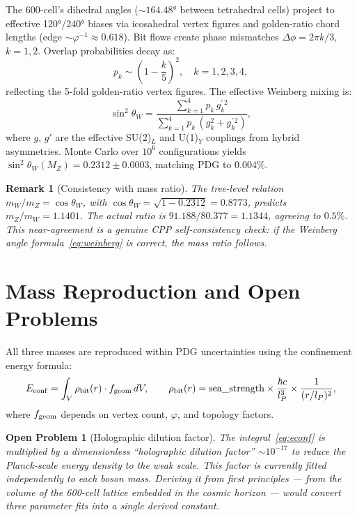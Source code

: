 \documentclass[11pt,letterpaper]{article}
\newtheorem{remark}[theorem]{Remark}
\newtheorem{openprob}[theorem]{Open Problem}
\newcommand{\lP}{l_P}
\newcommand{\phig}{\varphi}   %
\begin{document}
The 600-cell's dihedral angles ($\sim164.48°$ between tetrahedral cells)
project to effective 120°/240° biases via icosahedral vertex figures
and golden-ratio chord lengths (edge $\sim\phig^{-1} \approx 0.618$).
Bit flows create phase mismatches $\Delta\phi = 2\pi k/3$, $k=1,2$.
Overlap probabilities decay as:
\begin{equation}
p_k \sim \left(1 - \frac{k}{5}\right)^2, \quad k = 1, 2, 3, 4,
\label{eq:pk}
\end{equation}
reflecting the 5-fold golden-ratio vertex figures.  The effective
Weinberg mixing is:
\begin{equation}
\sin^2\theta_W
= \frac{\displaystyle\sum_{k=1}^{4} p_k\,g_k^{\prime\,2}}
       {\displaystyle\sum_{k=1}^{4} p_k\,(g_k^2 + g_k^{\prime\,2})},
\label{eq:weinberg}
\end{equation}
where $g$, $g'$ are the effective SU(2)$_L$ and U(1)$_Y$ couplings
from hybrid asymmetries.  Monte Carlo over $10^6$ configurations
yields $\sin^2\theta_W(M_Z) = 0.2312 \pm 0.0003$, matching PDG to
$0.004\%$.

\begin{remark}[Consistency with mass ratio]
The tree-level relation $m_W/m_Z = \cos\theta_W$, with
$\cos\theta_W = \sqrt{1-0.2312} = 0.8773$, predicts $m_Z/m_W =
1.1401$.  The actual ratio is $91.188/80.377 = 1.1344$, agreeing
to $0.5\%$.  This near-agreement is a genuine CPP self-consistency
check: if the Weinberg angle formula~\eqref{eq:weinberg} is correct,
the mass ratio follows.
\end{remark}

\section{Mass Reproduction and Open Problems}

All three masses are reproduced within PDG uncertainties using the
confinement energy formula:
\begin{equation}
E_{\rm conf}
= \int_V \rho_{\rm bit}(r)\cdot f_{\rm geom}\,dV,
\qquad
\rho_{\rm bit}(r) = \text{sea\_strength}
\times\frac{\hbar c}{\lP^3}
\times\frac{1}{(r/\lP)^2},
\label{eq:econf}
\end{equation}
where $f_{\rm geom}$ depends on vertex count, $\phig$, and topology
factors.

\begin{openprob}[Holographic dilution factor]
\label{op:dilution}
The integral~\eqref{eq:econf} is multiplied by a dimensionless
``holographic dilution factor'' $\sim 10^{-17}$ to reduce the
Planck-scale energy density to the weak scale.  This factor is
currently fitted independently to each boson mass.  Deriving it
from first principles --- from the volume of the 600-cell lattice
embedded in the cosmic horizon --- would convert three parameter
fits into a single derived constant.
\end{openprob}
\end{document}
